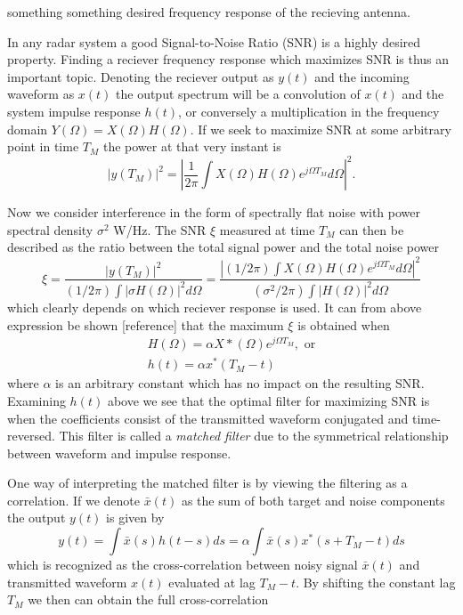 \documentclass[a4paper, 12pt]{article}
\begin{document}
something something desired frequency response of the recieving antenna. 

In any radar system a good Signal-to-Noise Ratio (SNR) is a highly desired property. Finding a reciever frequency response which maximizes SNR is thus an important topic. Denoting the reciever output as $y(t)$ and the incoming waveform as $x(t)$ the output spectrum will be a convolution of $x(t)$ and the system impulse response $h(t)$, or conversely a multiplication in the frequency domain $Y(\Omega) = X(\Omega)H(\Omega)$. If we seek to maximize SNR at some arbitrary point in time $T_M$ the power at that very instant is
%
\begin{equation}
	|y(T_M)|^{2} = |\frac{1}{2\pi}\int X(\Omega)H(\Omega)e^{j\Omega T_M} d\Omega|^{2}.
\end{equation}

Now we consider interference in the form of spectrally flat noise with power spectral density $\sigma^2$ W/Hz. The SNR $\xi$ measured at time $T_M$ can then be described as the ratio between the total signal power and the total noise power
%
\begin{equation}
	\xi
	= \frac{|y(T_M)|^{2}}{(1/2\pi)\int|\sigma H(\Omega)|^{2}d\Omega}
	= \frac{|(1/2\pi)\int X(\Omega)H(\Omega)e^{j\Omega T_M}d\Omega|^2}{(\sigma^2/2\pi)\int|H(\Omega)|^{2}d\Omega}
\end{equation}
%
which clearly depends on which reciever response is used. It can from above expression be shown [reference] that the maximum $\xi$ is obtained when 
%
\begin{gather}
 H(\Omega) = \alpha X*(\Omega)e^{j\Omega T_M}, \text{ or} \\
\label{eq:123}
h(t) = \alpha x^*(T_M - t)
\end{gather}
%
where $\alpha$ is an arbitrary constant which has no impact on the resulting SNR. Examining $h(t)$ above we see that the optimal filter for maximizing SNR is when the coefficients consist of the transmitted waveform conjugated and time-reversed. This filter is called a \emph{matched filter} due to the symmetrical relationship between waveform and impulse response.

One way of interpreting the matched filter is by viewing the filtering as a correlation. If we denote $\bar{x}(t)$ as the sum of both target and noise components the output $y(t)$ is given by
%
\begin{equation}
	y(t) = \int \bar{x}(s)h(t-s)ds = \alpha\int \bar{x}(s)x^*(s + T_M - t)ds
\end{equation}
%
which is recognized as the cross-correlation between noisy signal $\bar	{x}(t)$ and transmitted waveform $x(t)$ evaluated at lag $T_M-t$. By shifting the constant lag $T_M$ we then can obtain the full cross-correlation 
\end{document}
